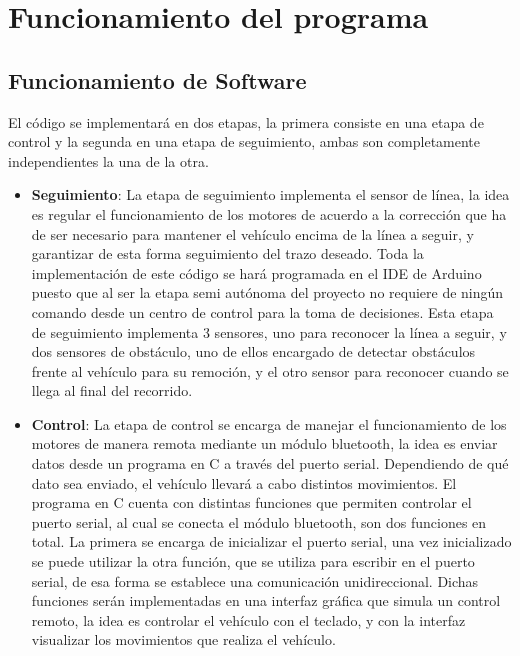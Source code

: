 \section{Funcionamiento del programa}
\subsection{Funcionamiento de Software}

El código se implementará en dos etapas, la primera consiste en una etapa de control y la segunda en una etapa de seguimiento, ambas son completamente independientes la una de la otra.

\begin{itemize}
    \item \textbf{Seguimiento}: La etapa de seguimiento implementa el sensor de línea, la idea es regular el funcionamiento de los motores de acuerdo a la corrección que ha de ser necesario para mantener el vehículo encima de la línea a seguir, y garantizar de esta forma seguimiento del trazo deseado. Toda la implementación de este código se hará programada en el IDE de Arduino puesto que al ser la etapa semi autónoma del proyecto no requiere de ningún comando desde un centro de control para la toma de decisiones. 
    Esta etapa de seguimiento implementa 3 sensores, uno para reconocer la línea a seguir, y dos sensores de obstáculo, uno de ellos encargado de detectar obstáculos frente al vehículo para su remoción, y el otro sensor para reconocer cuando se llega al final del recorrido.
    
    \item \textbf{Control}: La etapa de control se encarga de manejar el funcionamiento de los motores de manera remota mediante un módulo bluetooth, la idea es enviar datos desde un programa en C a través del puerto serial. Dependiendo de qué dato sea enviado, el vehículo llevará a cabo distintos movimientos. El programa en C cuenta con distintas funciones que permiten controlar el puerto serial, al cual se conecta el módulo bluetooth, son dos funciones en total. La primera se encarga de inicializar el puerto serial, una vez inicializado se puede utilizar la otra función, que se utiliza para escribir en el puerto serial, de esa forma se establece una comunicación unidireccional. Dichas funciones serán implementadas en una interfaz gráfica que simula un control remoto, la idea es controlar el vehículo con el teclado, y con la interfaz visualizar los movimientos que realiza el vehículo.
\end{itemize}

